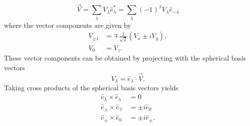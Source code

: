 \documentclass[12pt,letterpaper]{book}
\begin{document}
\begin{equation}
\vec{V}=\sum_\lambda V_\lambda \hat{e}_\lambda^*=\sum_{\lambda}(-1)^\lambda V_\lambda \hat{e}_{-\lambda}
\end{equation}
where the vector components are given by
\begin{equation}
\begin{split}
V_{\pm 1}&=\mp \frac{1}{\sqrt{2}}\left(V_x\pm i V_y\right),\\
V_0&=V_z.
\end{split}
\end{equation}
These vector components can be obtained by projecting with the spherical basis vectors
\begin{equation}
V_\lambda=\hat{e}_\lambda\cdot\vec{V}.
\end{equation}
Taking cross products of the spherical basis vectors yields
\begin{equation}
\begin{split}
\hat{e}_{\lambda}\times\hat{e}_{\lambda}&=0\\
\hat{e}_{\pm}\times\hat{e}_{\mp}&=\pm i\hat{e}_0\\
\hat{e}_{\pm}\times\hat{e}_0&=\pm i\hat{e}_{\pm}.
\end{split}
\end{equation}
\end{document}
